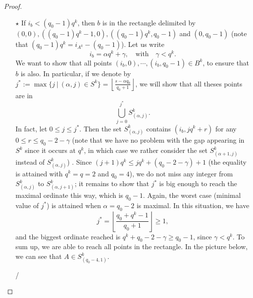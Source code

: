 \documentclass[a4paper]{article}
\newcommand\jade[1]{\textcolor{purple}{#1}}
\begin{document}
\begin{proof}
\begin{itemize}
    \item[$\star$] If $i_b < (q_0-1)q^k$, then $b$ is in the rectangle delimited by $(0,0), ((q_0-1)q^k-1,0), ((q_0-1)q^k,q_0-1)$ and $(0,q_0-1)$ (note that $(q_0-1)q^k=i_{A^k}-(q_0-1)$). Let us write
    \[i_b = \alpha q^k+\gamma, \quad \mathrm{with} \quad \gamma < q^k.\]
    We want to show that all points $(i_b,0),\cdots,(i_b,q_0-1) \in B^k$, to ensure that $b$ is also. In particular, if we denote by $j^*:=\max \{j \ | \ (\alpha,j) \in S^k\} = \left\lfloor \frac{s-\alpha q_0}{q_0+1}\right\rfloor$, we will show that all theses points are in 
    \[\bigcup_{j=0}^{j^*} S^k_{(\alpha,j)}.\]
    In fact, let $0 \leq j \leq j^*$. Then the set $ S^k_{(\alpha,j)}$ contains $(i_b,jq^k+r)$ for any $0 \leq r \leq q_0-2-\gamma$ (note that we have no problem with the gap appearing in $S^k$ since it occurs at $q^k$, in which case we rather consider the set  $ S^k_{(\alpha+1,j)}$ instead of  $ S^k_{(\alpha,j)}$) . Since $(j+1)q^k \leq jq^k + (q_0-2-\gamma)+1$ (the equality is attained with $q^k=q=2$ and $q_0=4$), we do not miss any integer from $S^k_{(\alpha,j)}$ to $S^k_{(\alpha,j+1)}$; it remains to show that $j^*$ is big enough to reach the maximal ordinate this way, which is $q_0-1$. Again, the worst case (minimal value of $j^*$) is attained when $\alpha = q_0-2$ is maximal. In this situation, we have 
    \[j^* = \left\lfloor \dfrac{q_0+q^k-1}{q_0+1}\right\rfloor \geq 1,\]
    and the biggest ordinate reached is $q^k+q_0-2-\gamma \geq q_0-1$, since $\gamma < q^k$. To sum up, we are able to reach all points in the rectangle. In the picture below, we can see that $A \in S^k_{(q_0-4,1)}$. 

/%

\begin{figure}[h]
\begin{center}
\end{center}
\end{figure}
\end{itemize}
\end{proof}
\end{document}

